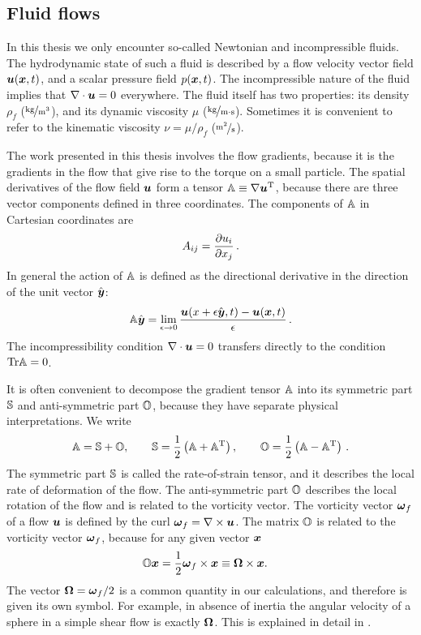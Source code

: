 \documentclass[thesis.tex]{subfiles}
\begin{document}
\subsection{Fluid flows}\label{sec:fluidflows}

In this thesis we only encounter so-called Newtonian and incompressible fluids. The hydrodynamic state of such a fluid is described by a flow velocity vector field $\mbox{\boldmath$u$}(\mbox{\boldmath$x$},t)$, and a scalar pressure field $p(\mbox{\boldmath$x$}, t)$. The incompressible nature of the fluid implies that $\nabla \cdot \mbox{\boldmath$u$} = 0$ everywhere.
The fluid itself has two properties: its density $\rho_f$ ($\unitfrac{kg}{m^3}$), and its dynamic viscosity $\mu$ ($\unitfrac{kg}{m\cdot s}$). Sometimes it is convenient to refer to the kinematic viscosity $\nu = \mu / \rho_f$ ($\unitfrac{m^2}{s}$).

The work presented in this thesis involves the flow gradients, because it is the gradients in the flow that give rise to the torque on a small particle. The spatial derivatives of the flow field $\mbox{\boldmath$u$}$ form a tensor $\mathbb{A} \equiv \nabla \mbox{\boldmath$u$}^{\mathrm T}$, because there are three vector components defined in three coordinates. The components of $\mathbb{A}$ in Cartesian coordinates are
\begin{align}
A_{ij}=\frac{\partial u_i}{\partial x_j}\,.	
\end{align}
In general the action of $\mathbb{A}$ is defined as the directional derivative in the direction of the unit vector $\hat{\mbox{\boldmath$y$}}$:
\begin{align}
 	\mathbb{A}\hat{\mbox{\boldmath$y$}} = \lim_{\epsilon\to 0}\frac{\mbox{\boldmath$u$}(x+\epsilon \hat{\mbox{\boldmath$y$}},t)-\mbox{\boldmath$u$}(\mbox{\boldmath$x$}, t)}{\epsilon}\,.
\end{align}
The incompressibility condition $\nabla\cdot\mbox{\boldmath$u$}=0$ transfers directly to the condition $\mbox{Tr} \mathbb{A}=0$.

It is often convenient to decompose the gradient tensor $\mathbb{A}$ into its symmetric part $\mathbb{S}$ and anti-symmetric part $\mathbb{O}$, because they have separate physical interpretations. We write
\begin{align}
	\mathbb{A} = \mathbb{S} + \mathbb{O},\qquad
	\mathbb{S} = \frac{1}{2}\left(\mathbb{A} + \mathbb{A}^{\mathrm T}\right),\qquad
	\mathbb{O} = \frac{1}{2}\left(\mathbb{A} - \mathbb{A}^{\mathrm T}\right)\,.
\end{align}
The symmetric part $\mathbb{S}$ is called the rate-of-strain tensor, and it describes the local rate of deformation of the flow. The anti-symmetric part $\mathbb{O}$ describes the local rotation of the flow and is related to the vorticity vector. The vorticity vector $\mbox{\boldmath$\omega$}_f$ of a flow $\mbox{\boldmath$u$}$ is defined by the curl $\mbox{\boldmath$\omega$}_f = \nabla \times \mbox{\boldmath$u$}$. The matrix $\mathbb{O}$ is related to the vorticity vector $\mbox{\boldmath$\omega$}_f$, because for any given vector $\mbox{\boldmath$x$}$
\begin{align}
	\ma O \ve x &= \frac{1}{2}\ve \omega_f \cross \ve x \equiv \ve \Omega \cross \ve x.\eqnlab{vorticityOdef}
\end{align}
The vector $\mbox{\boldmath$\Omega$}=\mbox{\boldmath$\omega$}_f/2$ is a common quantity in our calculations, and therefore is given its own symbol. For example, in absence of inertia the angular velocity of a sphere in a simple shear flow is exactly $\mbox{\boldmath$\Omega$}$. This is explained in detail in .
\end{document}
